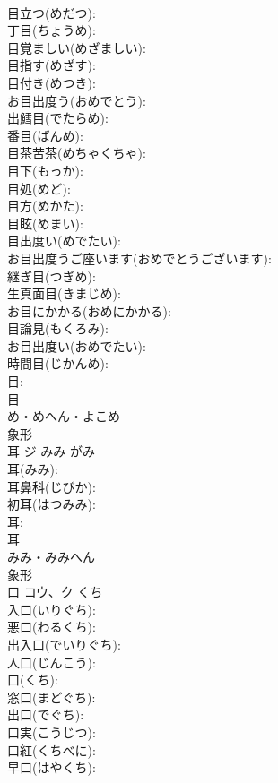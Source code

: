 \documentclass[8pt]{extreport}
\begin{document}
\begin{CJK}{UTF8}{min}
\\	目立つ(めだつ): 
\\	丁目(ちょうめ): 
\\	目覚ましい(めざましい): 
\\	目指す(めざす): 
\\	目付き(めつき): 
\\	お目出度う(おめでとう): 
\\	出鱈目(でたらめ): 
\\	番目(ばんめ): 
\\	目茶苦茶(めちゃくちゃ): 
\\	目下(もっか): 
\\	目処(めど): 
\\	目方(めかた): 
\\	目眩(めまい): 
\\	目出度い(めでたい): 
\\	お目出度うご座います(おめでとうございます): 
\\	継ぎ目(つぎめ): 
\\	生真面目(きまじめ): 
\\	お目にかかる(おめにかかる): 
\\	目論見(もくろみ): 
\\	お目出度い(おめでたい): 
\\	時間目(じかんめ): 
\\	目: 
\\	目	
\\	め・めへん・よこめ	
\\	象形 
\\	耳	ジ	みみ	がみ	
\\	耳(みみ): 
\\	耳鼻科(じびか): 
\\	初耳(はつみみ): 
\\	耳: 
\\	耳	
\\	みみ・みみへん	
\\	象形 
\\	口	コウ、ク	くち		
\\	入口(いりぐち): 
\\	悪口(わるくち): 
\\	出入口(でいりぐち): 
\\	人口(じんこう): 
\\	口(くち): 
\\	窓口(まどぐち): 
\\	出口(でぐち): 
\\	口実(こうじつ): 
\\	口紅(くちべに): 
\\	早口(はやくち): 

\end{CJK}
\end{document}
